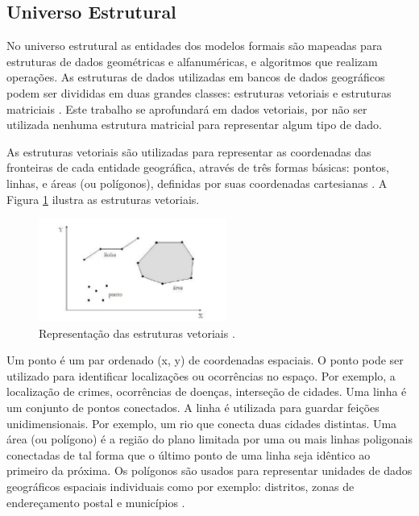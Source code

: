 \subsection{Universo Estrutural}

No universo estrutural as entidades dos modelos formais são mapeadas para estruturas de dados geométricas e alfanuméricas, e algoritmos que realizam operações. As estruturas de dados utilizadas em bancos de dados geográficos podem ser divididas em duas grandes classes: estruturas vetoriais e estruturas matriciais \cite{queirozferreira}. Este trabalho se aprofundará em dados vetoriais, por não ser utilizada nenhuma estrutura matricial para representar algum tipo de dado.

As estruturas vetoriais são utilizadas para representar as coordenadas das fronteiras de cada entidade geográfica, através de três formas básicas: pontos, linhas, e áreas (ou polígonos), definidas por suas coordenadas cartesianas \cite{queirozferreira}. A Figura \ref{fig:EstruturaVetorial} ilustra as estruturas vetoriais.

\begin{figure}[h]
\centering
\includegraphics[width=0.55\textwidth]{./img/cap_II/6-EstruturaVetorial}
\caption{Representação das estruturas vetoriais \cite{queirozferreira}.}
\label{fig:EstruturaVetorial}
\end{figure}

\newpage

Um ponto é um par ordenado (x, y) de coordenadas espaciais. O ponto pode ser utilizado para identificar localizações ou ocorrências no espaço. Por exemplo, a localização de crimes, ocorrências de doenças, interseção de cidades. Uma linha é um conjunto de pontos conectados. A linha é utilizada para guardar feições unidimensionais. Por exemplo, um rio que conecta duas cidades distintas. Uma área (ou polígono) é a região do plano limitada por uma ou mais linhas poligonais conectadas de tal forma que o último ponto de uma linha seja idêntico ao primeiro da próxima. Os polígonos são usados para representar unidades de dados geográficos espaciais individuais como por exemplo: distritos, zonas de endereçamento postal e municípios \cite{queirozferreira}.

